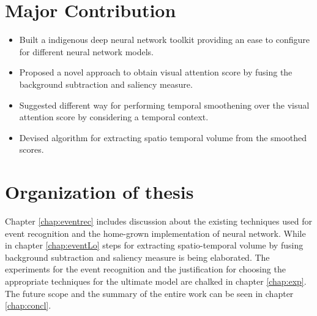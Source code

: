 \section{Major Contribution}
\begin{itemize}
	\item{Built a indigenous deep neural network toolkit providing an ease to configure for different neural network models.}
	\item{Proposed a novel approach to obtain visual attention score by fusing the background subtraction and saliency measure.}
	\item{Suggested different way for performing temporal smoothening over the visual attention score by considering a temporal context.}
	\item{Devised algorithm for extracting spatio temporal volume from the smoothed scores.}
\end{itemize}

\section{Organization of thesis}
\par Chapter \ref{chap:eventrec} includes discussion about the existing techniques used for event recognition and the home-grown implementation of neural network. While in chapter \ref{chap:eventLo} steps for extracting spatio-temporal volume by fusing background subtraction and saliency measure is being elaborated. The experiments for the event recognition and the justification for choosing the appropriate techniques for the ultimate model are chalked in chapter \ref{chap:exp}. The future scope and the summary of the entire work can be seen in chapter \ref{chap:concl}.